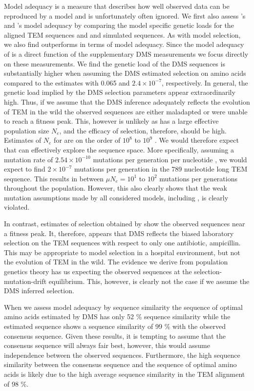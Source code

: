 Model adequacy is a measure that describes how well observed data can be reproduced by a model and is unfortunately often ignored.
We first also assess \phydms's and \selac's model adequacy by comparing the model specific genetic loads for the aligned TEM sequences and and simulated sequences.
As with model selection, we also find \selac outperforms \phydms in terms of model adequacy.
Since the model adequacy of \phydms is a direct function of the supplementary DMS measurements we focus directly on these measurements.
We find the genetic load of the DMS sequences is substantially higher when assuming the DMS estimated selection on amino acids compared to the \selac estimates with 0.065 and  $2.4\times 10^{-7}$, respectively.
In general, the genetic load implied by the DMS selection parameters appear extraordinarily high.
Thus, if we assume that the DMS inference adequately reflects the evolution of TEM in the wild the observed sequences are either maladapted or were unable to reach a fitness peak.
This, however is unlikely as \ecoli has a large effective population size $N_e$, and the efficacy of selection, therefore, should be high.
Estimates of $N_e$ for \ecoli are on the order of $10^8$ to $10^9$ \citep{OchmanAndWilson1987,hartl1994}.
We would therefore expect that \ecoli can effectively explore the sequence space.
More specifically, assuming a mutation rate of $2.54\times 10^{-10}$ mutations per generation per nucleotide \citep{lee2012}, we would expect to find $2\times 10^{-7}$ mutations per generation in the 789 nucleotide long TEM sequence.
This results in between $\mu N_e = 10^1$ to $10^2$ mutations per generations throughout the population.
However, this also clearly shows that the weak mutation assumptions made by all considered models, including \selac, is clearly violated.

In contrast, estimates of selection obtained by \selac show the observed sequences near a fitness peak.
It, therefore, appears that DMS reflects the biased laboratory selection on the TEM sequences with respect to only one antibiotic, ampicillin. 
This may be appropriate to model selection in a hospital environment, but not the evolution of TEM in the wild.
The evidence we derive from population genetics theory has us expecting the observed sequences at the selection-mutation-drift equilibrium.
This, however, is clearly not the case if we assume the DMS inferred selection.

When we assess model adequacy by sequence similarity the sequence of optimal amino acids estimated by DMS has only 52 \% sequence similarity while the \selac estimated sequence shows a sequence similarity of 99 \% with the observed consensus sequence.
Given these results, it is tempting to assume that the consensus sequence will always fair best, however, this would assume independence between the observed sequences.
Furthermore, the high sequence similarity between the consensus sequence and the sequence of optimal amino acids is likely due to the high average sequence similarity in the TEM alignment of 98 \%.

